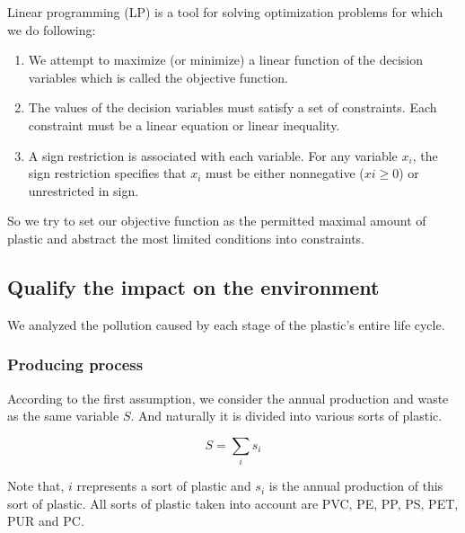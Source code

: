 \documentclass{mcmthesis}
\begin{document}
Linear programming\cite{Hillier} (LP) is a tool for solving optimization problems for which we do following:

\begin{enumerate}
	\item We attempt to maximize (or minimize) a linear function of the decision variables which is called the objective function. 
	\item The values of the decision variables must satisfy a set of constraints. Each constraint must be a linear equation or linear inequality.
	\item A sign restriction is associated with each variable. For any variable $x_i$, the sign restriction specifies that $x_i$ must be either nonnegative ($xi \ge 0$) or unrestricted in sign.
\end{enumerate}

So we try to set our objective function as the permitted maximal amount of plastic and abstract the most limited conditions into constraints.

%



\subsection{Qualify the impact on the environment}

We analyzed the pollution caused by each stage of the plastic's entire life cycle.

\subsubsection{Producing process}

According to the first assumption, we consider the annual production and waste as the same variable $S$. And naturally it is divided into various sorts of plastic.

\begin{equation}
S = \sum_i{s_i}
\label{S}
\end{equation}

Note that, $i$ rrepresents a sort of plastic and $s_i$ is the annual production of this sort of plastic. All sorts of plastic taken into account are PVC, PE, PP, PS, PET, PUR and PC\cite{book}.
\end{document}
